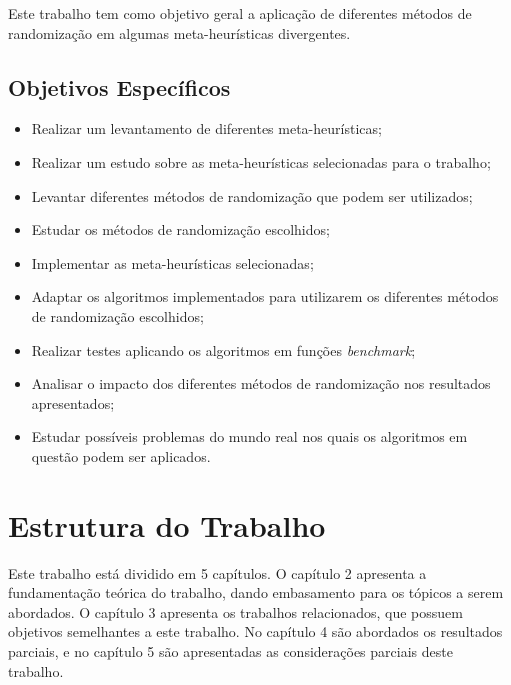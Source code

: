 Este trabalho tem como objetivo geral a aplicação de diferentes métodos de randomização em algumas meta-heurísticas divergentes.

\subsection{Objetivos Específicos}

\begin{itemize}
    \item Realizar um levantamento de diferentes meta-heurísticas;
    \item Realizar um estudo sobre as meta-heurísticas selecionadas para o trabalho;
    \item Levantar diferentes métodos de randomização que podem ser utilizados;
    \item Estudar os métodos de randomização escolhidos;
    \item Implementar as meta-heurísticas selecionadas;
    \item Adaptar os algoritmos implementados para utilizarem os diferentes métodos de randomização escolhidos;
    \item Realizar testes aplicando os algoritmos em funções \textit{benchmark};
    \item Analisar o impacto dos diferentes métodos de randomização nos resultados apresentados;
    \item Estudar possíveis problemas do mundo real nos quais os algoritmos em questão podem ser aplicados.
\end{itemize}

\section{Estrutura do Trabalho}

Este trabalho está dividido em 5 capítulos. O capítulo 2 apresenta a fundamentação teórica do trabalho, dando embasamento para os tópicos a serem abordados. O capítulo 3 apresenta os trabalhos relacionados, que possuem objetivos semelhantes a este trabalho. No capítulo 4 são abordados os resultados parciais, e no capítulo 5 são apresentadas as considerações parciais deste trabalho.


